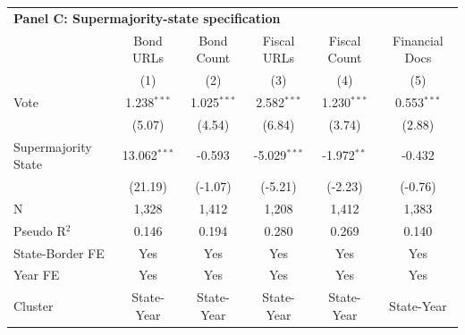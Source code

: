 \begingroup
\centering
\begin{tabular*}{\textwidth}{@{\extracolsep{\fill}}lccccc}
\multicolumn{6}{l}{\textbf{Panel C: Supermajority-state specification}}\\

\addlinespace
   \toprule
                       & Bond URLs      & Bond Count    & Fiscal URLs    & Fiscal Count  & Financial Docs\\  
                       & (1)            & (2)           & (3)            & (4)           & (5)\\  
   \midrule 
   Vote                & 1.238$^{***}$  & 1.025$^{***}$ & 2.582$^{***}$  & 1.230$^{***}$ & 0.553$^{***}$\\   
                       & (5.07)        & (4.54)       & (6.84)        & (3.74)       & (2.88)\\   
   Supermajority State & 13.062$^{***}$ & -0.593        & -5.029$^{***}$ & -1.972$^{**}$ & -0.432\\   
                       & (21.19)       & (-1.07)      & (-5.21)       & (-2.23)      & (-0.76)\\   
   \hline
   N        & 1,328          & 1,412         & 1,208          & 1,412         & 1,383\\  
   Pseudo R$^2$        & 0.146          & 0.194         & 0.280          & 0.269         & 0.140\\  
   State-Border FE     & Yes            & Yes           & Yes            & Yes           & Yes\\  
   Year FE             & Yes            & Yes           & Yes            & Yes           & Yes\\  
   Cluster              & State-Year & State-Year & State-Year & State-Year & State-Year\\  
   \bottomrule
\end{tabular*}
\par\endgroup

